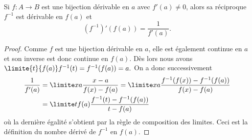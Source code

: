 \begin{frame}%
  \begin{proposition}
    Si \(f : A \to B\) est une bijection dérivable en \(a\) avec \(f'(a)\neq 0\), alors sa réciproque \(f^{-1}\) est dérivable en \(f(a)\) et
    \begin{equation*}
      (f^{-1})'(f(a)) = \frac{1}{f'(a)}.
    \end{equation*}
  \end{proposition}
  \begin{proof}\pause
    Comme \(f\) est une bijection dérivable en \(a\), elle est également continue en \(a\) et son inverse est donc continue en \(f(a)\).\pause{} Dès lors nous avons
    \begin{math}
      \limite{t}{f(a)} f^{-1}(t) = f^{-1}(f(a)) = a.
    \end{math}\pause{}
    On a donc successivement
    \begin{align*}
      \frac{1}{f'(a)} &= \limite x a \frac{x-a}{f(x)-f(a)} = \limite x a \frac{f^{-1}(f(x)) - f^{-1}(f(a))}{f(x)-f(a)} \\
      &= \limite t f(a) \frac{f^{-1}(t) - f^{-1}(f(a))}{t-f(a)}
    \end{align*}\pause
    où la dernière égalité s'obtient par la règle de composition des limites.\pause{} Ceci est la définition du nombre dérivé de \(f^{-1}\) en \(f(a)\).
  \end{proof}
\end{frame}

